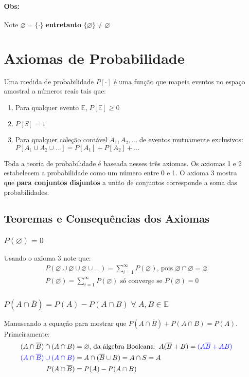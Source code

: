 \documentclass{article}
\makeatletter
\renewcommand\bf[1]{\textbf{#1}}
\newcommand\ov[1]{\overline{#1}}
\newcommand{\vn}{\varnothing}
\def\mcolor#1#{\@mcolor{#1}}
\def\@mcolor#1#2#3{%
  \protect\leavevmode
  \begingroup
    \color#1{#2}#3%
  \endgroup
}
\makeatother
\begin{document}
\paragraph{Obs:} Note $\vn = \{\cdot\}$ \bf{entretanto} $\{\vn\} \neq \vn$

\section{Axiomas de Probabilidade}
Uma medida de probabilidade $P[\cdot]$ é uma função que mapeia eventos no espaço amostral a
números reais tais que:


\begin{enumerate}
    \setlength\itemsep{0em}
    \item Para qualquer evento $\mathbb{E}$, $P[\mathbb{E}] \geq 0$
    \item $P[S] = 1$
    \item Para qualquer coleção contável $A_1, A_2,\ldots$ de eventos mutuamente exclusivos:\\ $P[A_1
        \cup A_2 \cup \ldots] = P[A_1] + P[A_2] + \ldots$
\end{enumerate}

Toda a teoria de probabilidade é baseada nesses três axiomas. Os axiomas 1 e 2 estabelecem a
probabilidade como um número entre 0 e 1. O axioma 3 mostra que \bf{para conjuntos disjuntos} a
união de conjuntos corresponde a soma das probabilidades.

\subsection{Teoremas e Consequências dos Axiomas}
\subsubsection{$P(\vn) = 0$}
Usando o axioma 3 note que:
\begin{align*}
    P(\vn \cup \vn \cup \vn \cup \ldots) = \sum_{i=1}^{\infty} P(\vn) \text{, pois } \vn \cap \vn = \vn \\
    P(\vn) = \sum_{i=1}^{\infty} P(\vn) \text{ só converge se } P(\vn) = 0
\end{align*}

\subsubsection{$P(A \cap \ov{B}) = P(A) - P(A \cap B) \; \forall \; A,B \in \mathbb{E}$}
Manuseando a equação para mostrar que $P(A \cap \ov{B}) + P(A \cap B)= P(A)$. Primeiramente:
\begin{align*}
    (A \cap \ov{B}) \cap (A \cap B) &= \vn \text{, da álgebra Booleana: } A(\ov{B} + B) = \mcolor{blue}{(A\ov{B} + AB)}\\
    \mcolor{blue}{(A \cap \ov{B}) \cup (A \cap B)} &= A \cap (\ov{B} \cup B) = A \cap S = A \\
    P(A \cap \ov{B}) &= P(A) - P(A \cap B)
\end{align*}
\end{document}
